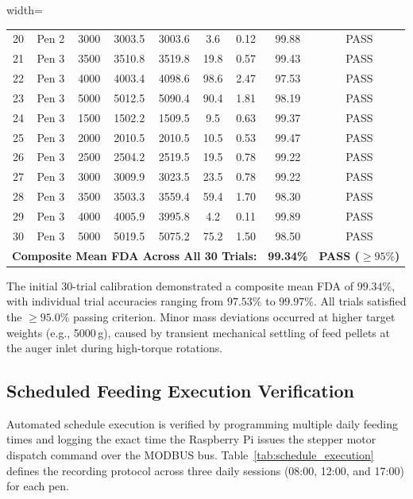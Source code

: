 \begin{table}[htbp!]
\begin{adjustbox}{width=\textwidth}
\begin{tabular}{ccccccccc}
20 & Pen 2 & 3000 & 3003.5 & 3003.6 & 3.6 & 0.12 & 99.88 & PASS \\
21 & Pen 3 & 3500 & 3510.8 & 3519.8 & 19.8 & 0.57 & 99.43 & PASS \\
22 & Pen 3 & 4000 & 4003.4 & 4098.6 & 98.6 & 2.47 & 97.53 & PASS \\
23 & Pen 3 & 5000 & 5012.5 & 5090.4 & 90.4 & 1.81 & 98.19 & PASS \\
24 & Pen 3 & 1500 & 1502.2 & 1509.5 & 9.5 & 0.63 & 99.37 & PASS \\
25 & Pen 3 & 2000 & 2010.5 & 2010.5 & 10.5 & 0.53 & 99.47 & PASS \\
26 & Pen 3 & 2500 & 2504.2 & 2519.5 & 19.5 & 0.78 & 99.22 & PASS \\
27 & Pen 3 & 3000 & 3009.9 & 3023.5 & 23.5 & 0.78 & 99.22 & PASS \\
28 & Pen 3 & 3500 & 3503.3 & 3559.4 & 59.4 & 1.70 & 98.30 & PASS \\
29 & Pen 3 & 4000 & 4005.9 & 3995.8 & 4.2 & 0.11 & 99.89 & PASS \\
30 & Pen 3 & 5000 & 5019.5 & 5075.2 & 75.2 & 1.50 & 98.50 & PASS \\
\midrule
\multicolumn{7}{l}{\textbf{Composite Mean FDA Across All 30 Trials:}} & \textbf{99.34\%} & \textbf{PASS ($\ge 95\%$)} \\
\bottomrule
\end{tabular}
\end{adjustbox}
\end{table}

The initial 30-trial calibration demonstrated a composite mean FDA of $99.34\%$, with individual trial accuracies ranging from $97.53\%$ to $99.97\%$. All trials satisfied the $\ge 95.0\%$ passing criterion. Minor mass deviations occurred at higher target weights (e.g., 5000\,g), caused by transient mechanical settling of feed pellets at the auger inlet during high-torque rotations.

\subsection{Scheduled Feeding Execution Verification}
Automated schedule execution is verified by programming multiple daily feeding times and logging the exact time the Raspberry Pi issues the stepper motor dispatch command over the MODBUS bus. Table~\ref{tab:schedule_execution} defines the recording protocol across three daily sessions (08:00, 12:00, and 17:00) for each pen.

